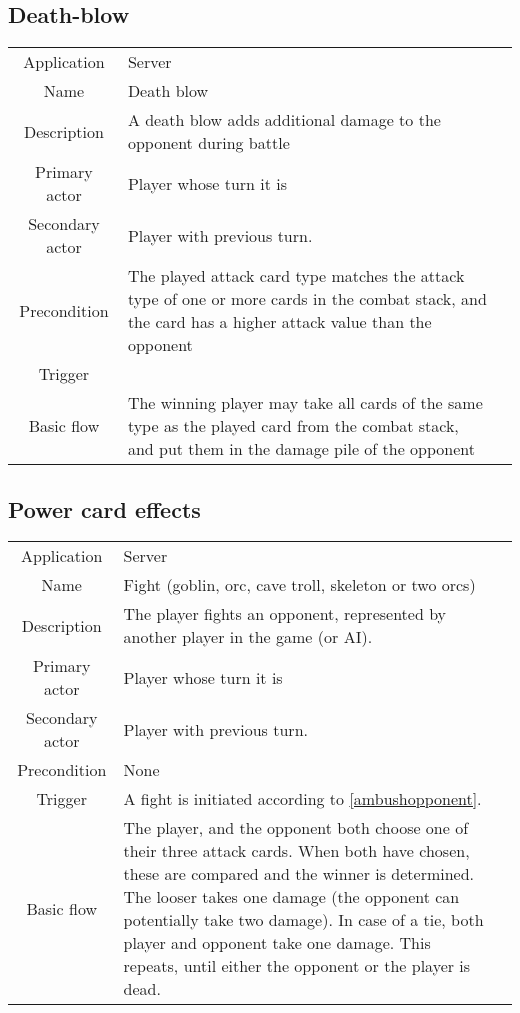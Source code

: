 \subsection{Death-blow}
\label{fight_deathblow}
\begin{tabular}{|c| p{9cm}|c}
\hline
Application & Server \\
Name & Death blow \\
Description & A death blow adds additional damage to the opponent during battle \\
Primary actor & Player whose turn it is \\
Secondary actor & Player with previous turn. \\
Precondition & The played attack card type matches the attack type of one or more cards in the combat stack, and the card has a higher attack value than the opponent \\
Trigger &  \\ \hline
Basic flow & The winning player may take all cards of the same type as the played card from the combat stack, and put them in the damage pile of the opponent \\
\hline
\end{tabular}



\subsection{Power card effects}
\label{fight_powercard}
\begin{tabular}{|c| p{9cm}|c}
\hline
Application & Server \\
Name & Fight (goblin, orc, cave troll, skeleton or two orcs) \\
Description & The player fights an opponent, represented by another player in the game (or AI). \\
Primary actor & Player whose turn it is \\
Secondary actor & Player with previous turn. \\
Precondition & None \\
Trigger & A fight is initiated according to \ref{ambushopponent}. \\ \hline
Basic flow & The player, and the opponent both choose one of their three attack cards. When both have chosen, these are compared and the winner is determined. The looser takes one damage (the opponent can potentially take two damage). In case of a tie, both player and opponent take one damage. This repeats, until either the opponent or the player is dead. \\
\hline
\end{tabular}


